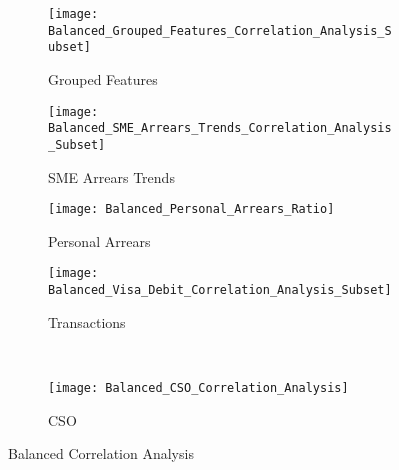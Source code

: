 \begin{figure}[H]
	\centering
	\begin{subfigure}[b]{0.32\textwidth}
		\captionsetup{font=scriptsize}
		\texttt{[image: Balanced\_Grouped\_Features\_Correlation\_Analysis\_Subset]}\caption{Grouped Features}\label{fig:groupedFeaturesCorrelation}
	\end{subfigure} 
	\begin{subfigure}[b]{0.32\textwidth}
		\captionsetup{font=scriptsize}
		\texttt{[image: Balanced\_SME\_Arrears\_Trends\_Correlation\_Analysis\_Subset]}
		\caption{SME Arrears Trends}\label{fig:smeArrearsCorrelation}
	\end{subfigure} 
	\begin{subfigure}[b]{0.32\textwidth}
		\captionsetup{font=scriptsize}
		\texttt{[image: Balanced\_Personal\_Arrears\_Ratio]}
		\caption{Personal Arrears}\label{fig:personalArrearsCorrelation}
	\end{subfigure} 
	\medskip
	\begin{subfigure}[b]{0.32\textwidth}
		\captionsetup{font=scriptsize}
		\texttt{[image: Balanced\_Visa\_Debit\_Correlation\_Analysis\_Subset]}
		\caption{Transactions}\label{fig:transVisaCorrelation}
	\end{subfigure} ~\quad
	\begin{subfigure}[b]{0.32\textwidth}
		\captionsetup{font=scriptsize}
		\texttt{[image: Balanced\_CSO\_Correlation\_Analysis]}
		\caption{CSO}\label{fig:CSOCorrelation}
	\end{subfigure}
	\caption{Balanced Correlation Analysis}
	\label{fig:balanced_corr_analysis}
\end{figure}

